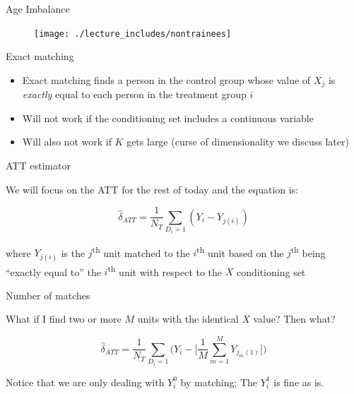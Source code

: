 \documentclass{beamer}
\begin{document}
\begin{frame}{Age Imbalance}

\begin{figure}[!t]\centering
\texttt{[image: ./lecture\_includes/nontrainees]}
\end{figure}

\end{frame}

\begin{frame}{Exact matching}

\begin{itemize}
\item Exact matching finds a person in the control group whose value of $X_j$ is \emph{exactly} equal to each person in the treatment group $i$
\item Will not work if the conditioning set includes a continuous variable
\item Will also not work if $K$ gets large (curse of dimensionality we discuss later)
\end{itemize}

\end{frame}



\begin{frame}{ATT estimator}

We will focus on the ATT for the rest of today and the equation is:

\begin{equation}
\widehat{\delta}_{ATT} = \dfrac{1}{N_T} \sum_{D_i=1}(Y_i - Y_{j(i)})
\label{eq:att_simplematch}
\end{equation}

where $Y_{j(i)}$ is the $j$\textsuperscript{th} unit matched to the $i$\textsuperscript{th} unit based on the $j$\textsuperscript{th} being ``exactly equal to'' the $i$\textsuperscript{th} unit with respect to the $X$ conditioning set

\end{frame}

\begin{frame}{Number of matches}

What if I find two or more $M$ units with the identical $X$ value? Then what?

\begin{equation}
\widehat{\delta}_{ATT} = \dfrac{1}{N_T} \sum_{D_i=1} \bigg ( Y_i - \bigg [\dfrac{1}{M} \sum_{m=1}^M Y_{j_m(1)} \bigg ] \bigg )
\label{eq:att_match}
\end{equation}

\bigskip

Notice that we are only dealing with $Y^0_i$ by matching; The $Y^1_i$ is fine as is.

\end{frame}
\end{document}

